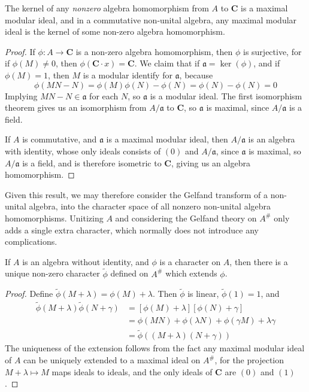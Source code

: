 \begin{lemma}
    The kernel of any {\it nonzero} algebra homomorphism from $A$ to $\mathbf{C}$ is a maximal modular ideal, and in a commutative non-unital algebra, any maximal modular ideal is the kernel of some non-zero algebra homomorphism.
\end{lemma}
\begin{proof}
    If $\phi: A \to \mathbf{C}$ is a non-zero algebra homomorphism, then $\phi$ is surjective, for if $\phi(M) \neq 0$, then $\phi(\mathbf{C} \cdot x) = \mathbf{C}$. We claim that if $\mathfrak{a} = \ker(\phi)$, and if $\phi(M) = 1$, then $M$ is a modular identify for $\mathfrak{a}$, because
    \[ \phi(MN - N) = \phi(M)\phi(N) - \phi(N) = \phi(N) - \phi(N) = 0 \]
    Implying $MN - N \in \mathfrak{a}$ for each $N$, so $\mathfrak{a}$ is a modular ideal. The first isomorphism theorem gives us an isomorphism from $A/\mathfrak{a}$ to $\mathbf{C}$, so $\mathfrak{a}$ is maximal, since $A/\mathfrak{a}$ is a field.

    If $A$ is commutative, and $\mathfrak{a}$ is a maximal modular ideal, then $A/\mathfrak{a}$ is an algebra with identity, whose only ideals consists of $(0)$ and $A/\mathfrak{a}$, since $\mathfrak{a}$ is maximal, so $A/\mathfrak{a}$ is a field, and is therefore isometric to $\mathbf{C}$, giving us an algebra homomorphism.
\end{proof}

Given this result, we may therefore consider the Gelfand transform of a non-unital algebra, into the character space of all nonzero non-unital algebra homomorphisms. Unitizing $A$ and considering the Gelfand theory on $A^\#$ only adds a single extra character, which normally does not introduce any complications.

\begin{lemma}
    If $A$ is an algebra without identity, and $\phi$ is a character on $A$, then there is a unique non-zero character $\tilde{\phi}$ defined on $A^\#$ which extends $\phi$.
\end{lemma}
\begin{proof}
    Define $\tilde{\phi}(M + \lambda) = \phi(M) + \lambda$. Then $\tilde{\phi}$ is linear, $\tilde{\phi}(1) = 1$, and
    \begin{align*}
        \tilde{\phi}(M + \lambda) \tilde{\phi}(N + \gamma) &= [\phi(M) + \lambda][\phi(N) + \gamma]\\
        &= \phi(MN) + \phi(\lambda N) + \phi(\gamma M) + \lambda \gamma\\
        &= \tilde{\phi}((M + \lambda)(N + \gamma))
    \end{align*}
    The uniqueness of the extension follows from the fact any maximal modular ideal of $A$ can be uniquely extended to a maximal ideal on $A^\#$, for the projection $M + \lambda \mapsto M$ maps ideals to ideals, and the only ideals of $\mathbf{C}$ are $(0)$ and $(1)$.
\end{proof}

